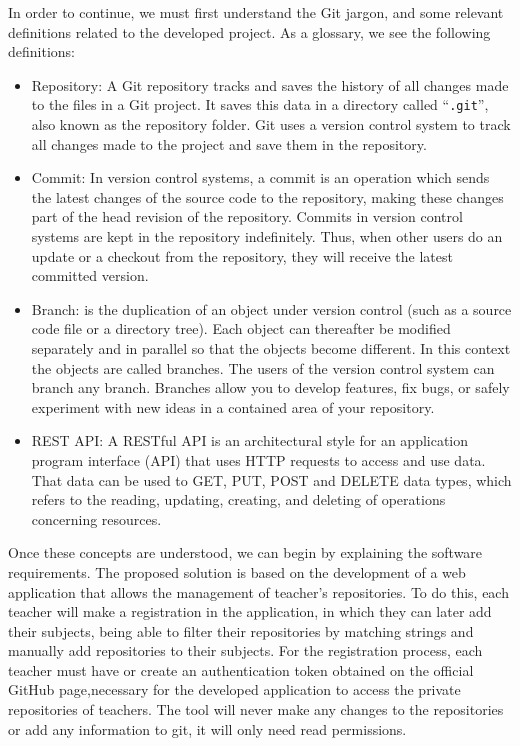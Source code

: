 In order to continue, we must first understand the Git jargon, and some
relevant definitions related to the developed project. As a glossary, we
see the following definitions:

\begin{itemize}
\item Repository: A Git repository tracks and saves the history of all
  changes made to the files in a Git project. It saves this data in a
  directory called ``\texttt{.git}'', also known as the
  repository folder. Git uses a version control system to track all
  changes made to the project and save them in the repository.

\item Commit: In version control systems, a commit is an operation which
  sends the latest changes of the source code to the repository, making
  these changes part of the head revision of the repository. Commits in
  version control systems are kept in the repository indefinitely. Thus,
  when other users do an update or a checkout from the repository, they
  will receive the latest committed version.

\item Branch: is the duplication of an object under version control (such
  as a source code file or a directory tree). Each object can thereafter be
  modified separately and in parallel so that the objects become different.
  In this context the objects are called branches. The users of the version
  control system can branch any branch. Branches allow you to develop
  features, fix bugs, or safely experiment with new ideas in a contained
  area of your repository.

\item REST API: A RESTful API is an architectural style for an application
  program interface (API) that uses HTTP requests to access and use data.
  That data can be used to GET, PUT, POST and DELETE data types, which
  refers to the reading, updating, creating, and deleting of operations
  concerning resources.
\end{itemize}

Once these concepts are understood, we can begin by explaining the software
requirements. The proposed solution is based on the development of a web
application that allows the management of teacher’s repositories. To do
this, each teacher will make a registration in the application, in which
they can later add their subjects, being able to filter their repositories
by matching strings and manually add repositories to their subjects. For
the registration process, each teacher must have or create an
authentication token obtained on the official GitHub page,necessary for the
developed application to access the private repositories of teachers. The
tool will never make any changes to the repositories or add any information
to git, it will only need read permissions.

